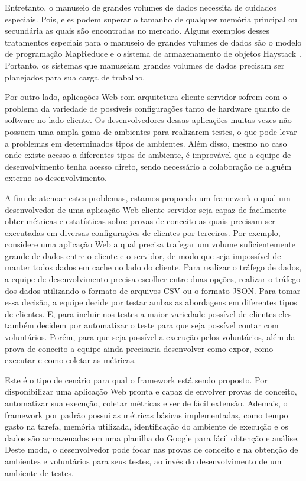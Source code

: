 \documentclass[12pt]{tcc}
\begin{document}
Entretanto, o manuseio de grandes volumes de dados necessita de cuidados especiais.
Pois, eles podem superar o tamanho de qualquer memória principal ou secundária as quais são encontradas no mercado.
Alguns exemplos desses tratamentos especiais para o manuseio de grandes volumes de dados são o modelo de programação MapReduce \citep{Dean2008MapReduce} e o sistema de armazenamento de objetos Haystack \citep{Beaver2010Finding}.
Portanto, os sistemas que manuseiam grandes volumes de dados precisam ser planejados para sua carga de trabalho.

Por outro lado, aplicações Web com arquitetura cliente-servidor sofrem com o problema da variedade de possíveis configurações tanto de hardware quanto de software no lado cliente.
Os desenvolvedores dessas aplicações muitas vezes não possuem uma ampla gama de ambientes para realizarem testes, o que pode levar a problemas em determinados tipos de ambientes.
Além disso, mesmo no caso onde existe acesso a diferentes tipos de ambiente, é improvável que a equipe de desenvolvimento tenha acesso direto, sendo necessário a colaboração de alguém externo ao desenvolvimento.

A fim de atenoar estes problemas, estamos propondo um framework o qual um desenvolvedor de uma aplicação Web cliente-servidor seja capaz de facilmente obter métricas e estatísticas sobre provas de conceito as quais precisam ser executadas em diversas configurações de clientes por terceiros.
Por exemplo, considere uma aplicação Web a qual precisa trafegar um volume suficientemente grande de dados entre o cliente e o servidor, de modo que seja impossível de manter todos dados em cache no lado do cliente.
Para realizar o tráfego de dados, a equipe de desenvolvimento precisa escolher entre duas opções, realizar o tráfego dos dados utilizando o formato de arquivos CSV ou o formato JSON.
Para tomar essa decisão, a equipe decide por testar ambas as abordagens em diferentes tipos de clientes.
E, para incluir nos testes a maior variedade possível de clientes eles também decidem por automatizar o teste para que seja possível contar com voluntários. 
Porém, para que seja possível a execução pelos voluntários, além da prova de conceito a equipe ainda precisaria desenvolver como expor, como executar e como coletar as métricas.

Este é o tipo de cenário para qual o framework está sendo proposto.
Por disponibilizar uma aplicação Web pronta e capaz de envolver provas de conceito, automatizar sua execução, coletar métricas e ser de fácil extensão.
Ademais, o framework por padrão possui as métricas básicas implementadas, como tempo gasto na tarefa, memória utilizada, identificação do ambiente de execução e os dados são armazenados em uma planilha do Google para fácil obtenção e análise.
Deste modo, o desenvolvedor pode focar nas provas de conceito e na obtenção de ambientes e voluntários para seus testes, ao invés do desenvolvimento de um ambiente de testes.
\end{document}
